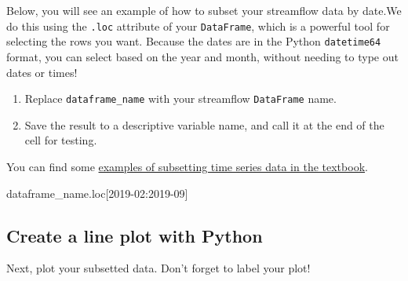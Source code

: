 \documentclass[
  letterpaper,
  DIV=11,
  numbers=noendperiod,
  oneside]{scrreprt}
\newenvironment{Shaded}{\begin{snugshade}}{\end{snugshade}}
\newcommand{\NormalTok}[1]{\textcolor[rgb]{0.00,0.23,0.31}{#1}}
\newcommand{\StringTok}[1]{\textcolor[rgb]{0.13,0.47,0.30}{#1}}
\providecommand{\tightlist}{%
  \setlength{\itemsep}{0pt}\setlength{\parskip}{0pt}}
\begin{document}
\begin{tcolorbox}[enhanced jigsaw, colbacktitle=quarto-callout-color!10!white, opacityback=0, bottomtitle=1mm, toptitle=1mm, bottomrule=.15mm, left=2mm, colframe=quarto-callout-color-frame, leftrule=.75mm, opacitybacktitle=0.6, colback=white, rightrule=.15mm, toprule=.15mm, breakable, titlerule=0mm, title=\textcolor{quarto-callout-color}{\faInfo}\hspace{0.5em}{Try It}, coltitle=black, arc=.35mm]

Below, you will see an example of how to subset your streamflow data by
date.We do this using the \texttt{.loc} attribute of your
\texttt{DataFrame}, which is a powerful tool for selecting the rows you
want. Because the dates are in the Python \texttt{datetime64} format,
you can select based on the year and month, without needing to type out
dates or times!

\begin{enumerate}
\def\labelenumi{\arabic{enumi}.}
\tightlist
\item
  Replace \texttt{dataframe\_name} with your streamflow
  \texttt{DataFrame} name.
\item
  Save the result to a descriptive variable name, and call it at the end
  of the cell for testing.
\end{enumerate}

\end{tcolorbox}

You can find some
\href{https://www.earthdatascience.org/courses/use-data-open-source-python/use-time-series-data-in-python/date-time-types-in-pandas-python/subset-time-series-data-python/}{examples
of subsetting time series data in the textbook}.

\begin{Shaded}
\begin{Highlighting}[]
\NormalTok{dataframe\_name.loc[}\StringTok{\textquotesingle{}2019{-}02\textquotesingle{}}\NormalTok{:}\StringTok{\textquotesingle{}2019{-}09\textquotesingle{}}\NormalTok{]}
\end{Highlighting}
\end{Shaded}

\subsection{Create a line plot with
Python}\label{create-a-line-plot-with-python}

Next, plot your subsetted data. Don't forget to label your plot!
\end{document}
